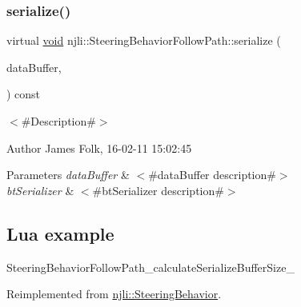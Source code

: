 \mbox{\label{classnjli_1_1_steering_behavior_follow_path_abf14bd10eee78a37827fabe77217e51d}} 
\subsubsection{\texorpdfstring{serialize()}{serialize()}}
{\footnotesize\ttfamily virtual \mbox{\hyperlink{_thread_8h_af1e856da2e658414cb2456cb6f7ebc66}{void}} njli\+::\+Steering\+Behavior\+Follow\+Path\+::serialize (\begin{DoxyParamCaption}\item[{\mbox{\hyperlink{_thread_8h_af1e856da2e658414cb2456cb6f7ebc66}{void}} $\ast$}]{data\+Buffer,  }\item[{bt\+Serializer $\ast$}]{ }\end{DoxyParamCaption}) const\hspace{0.3cm}{\ttfamily [virtual]}}



$<$\#\+Description\#$>$ 

\begin{DoxyAuthor}{Author}
James Folk, 16-\/02-\/11 15\+:02\+:45
\end{DoxyAuthor}

\begin{DoxyParams}{Parameters}
{\em data\+Buffer} & $<$\#data\+Buffer description\#$>$ \\
\hline
{\em bt\+Serializer} & $<$\#bt\+Serializer description\#$>$\\
\hline
\end{DoxyParams}
\hypertarget{classnjli_1_1_steering_behavior_wander_ex1}{}\subsection{Lua example}\label{classnjli_1_1_steering_behavior_wander_ex1}

\begin{DoxyCodeInclude}
\end{DoxyCodeInclude}
Steering\+Behavior\+Follow\+Path\+\_\+calculate\+Serialize\+Buffer\+Size\+\_\+ 

Reimplemented from \mbox{\hyperlink{classnjli_1_1_steering_behavior_aa8494cb4a327c0040f64cfe8b393786e}{njli\+::\+Steering\+Behavior}}.

